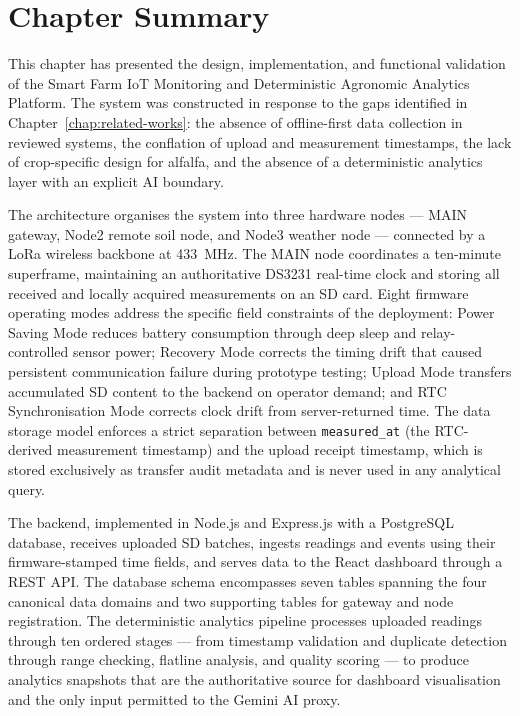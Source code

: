 \section{Chapter Summary}
\label{sec:ch3-summary}

This chapter has presented the design, implementation, and functional validation of the Smart Farm IoT Monitoring and Deterministic Agronomic Analytics Platform. The system was constructed in response to the gaps identified in Chapter~\ref{chap:related-works}: the absence of offline-first data collection in reviewed systems, the conflation of upload and measurement timestamps, the lack of crop-specific design for alfalfa, and the absence of a deterministic analytics layer with an explicit AI boundary.

The architecture organises the system into three hardware nodes — MAIN gateway, Node2 remote soil node, and Node3 weather node — connected by a LoRa wireless backbone at 433~MHz. The MAIN node coordinates a ten-minute superframe, maintaining an authoritative DS3231 real-time clock and storing all received and locally acquired measurements on an SD card. Eight firmware operating modes address the specific field constraints of the deployment: Power Saving Mode reduces battery consumption through deep sleep and relay-controlled sensor power; Recovery Mode corrects the timing drift that caused persistent communication failure during prototype testing; Upload Mode transfers accumulated SD content to the backend on operator demand; and RTC Synchronisation Mode corrects clock drift from server-returned time. The data storage model enforces a strict separation between \texttt{measured\_at} (the RTC-derived measurement timestamp) and the upload receipt timestamp, which is stored exclusively as transfer audit metadata and is never used in any analytical query.

The backend, implemented in Node.js and Express.js with a PostgreSQL database, receives uploaded SD batches, ingests readings and events using their firmware-stamped time fields, and serves data to the React dashboard through a REST API. The database schema encompasses seven tables spanning the four canonical data domains and two supporting tables for gateway and node registration. The deterministic analytics pipeline processes uploaded readings through ten ordered stages — from timestamp validation and duplicate detection through range checking, flatline analysis, and quality scoring — to produce analytics snapshots that are the authoritative source for dashboard visualisation and the only input permitted to the Gemini AI proxy.

